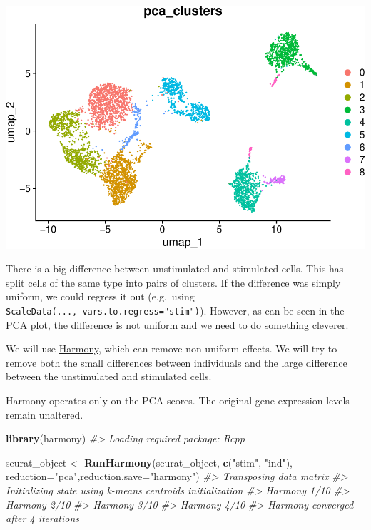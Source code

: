 \documentclass[
]{book}
\newenvironment{Shaded}{\begin{snugshade}}{\end{snugshade}}
\newcommand{\AttributeTok}[1]{\textcolor[rgb]{0.13,0.29,0.53}{#1}}
\newcommand{\CommentTok}[1]{\textcolor[rgb]{0.56,0.35,0.01}{\textit{#1}}}
\newcommand{\FunctionTok}[1]{\textcolor[rgb]{0.13,0.29,0.53}{\textbf{#1}}}
\newcommand{\NormalTok}[1]{#1}
\newcommand{\OtherTok}[1]{\textcolor[rgb]{0.56,0.35,0.01}{#1}}
\newcommand{\StringTok}[1]{\textcolor[rgb]{0.31,0.60,0.02}{#1}}
\begin{document}
\includegraphics{scRNAseqInR_ABACBS_2024_Doco_files/figure-latex/harmony1-3.pdf}

There is a big difference between unstimulated and stimulated cells. This has split cells of the same type into pairs of clusters. If the difference was simply uniform, we could regress it out (e.g.~using \texttt{ScaleData(...,\ vars.to.regress="stim")}). However, as can be seen in the PCA plot, the difference is not uniform and we need to do something cleverer.

We will use \href{https://github.com/immunogenomics/harmony}{Harmony}, which can remove non-uniform effects. We will try to remove both the small differences between individuals and the large difference between the unstimulated and stimulated cells.

Harmony operates only on the PCA scores. The original gene expression levels remain unaltered.

\begin{Shaded}
\begin{Highlighting}[]
\FunctionTok{library}\NormalTok{(harmony)}
\CommentTok{\#\textgreater{} Loading required package: Rcpp}

\NormalTok{seurat\_object }\OtherTok{\textless{}{-}} \FunctionTok{RunHarmony}\NormalTok{(seurat\_object, }\FunctionTok{c}\NormalTok{(}\StringTok{"stim"}\NormalTok{, }\StringTok{"ind"}\NormalTok{), }\AttributeTok{reduction=}\StringTok{"pca"}\NormalTok{,}\AttributeTok{reduction.save=}\StringTok{"harmony"}\NormalTok{)}
\CommentTok{\#\textgreater{} Transposing data matrix}
\CommentTok{\#\textgreater{} Initializing state using k{-}means centroids initialization}
\CommentTok{\#\textgreater{} Harmony 1/10}
\CommentTok{\#\textgreater{} Harmony 2/10}
\CommentTok{\#\textgreater{} Harmony 3/10}
\CommentTok{\#\textgreater{} Harmony 4/10}
\CommentTok{\#\textgreater{} Harmony converged after 4 iterations}
\end{Highlighting}
\end{Shaded}
\end{document}
